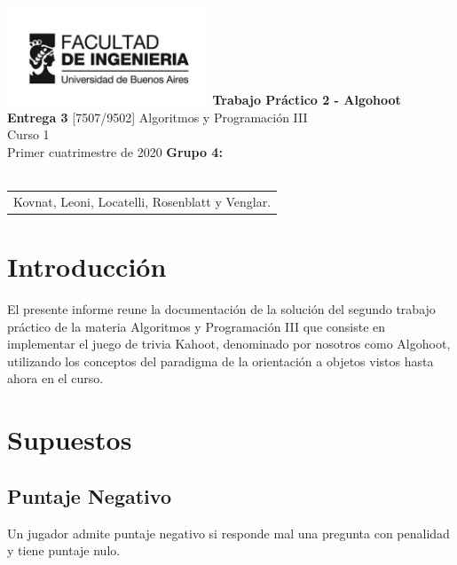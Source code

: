 \documentclass[titlepage,a4paper]{article}
\begin{document}
\begin{titlepage} %
	\hfill\includegraphics[width=6cm]{img/logofiuba.jpg}
    \centering
    \vfill
    \Huge \textbf{Trabajo Práctico 2 - Algohoot\\ Entrega 3}
    \vskip2cm
    \Large [7507/9502] Algoritmos y Programación III\\
    Curso 1\\ %
    Primer cuatrimestre de 2020 
    \vfill
    \textbf{Grupo 4:}\\$ $\\
    \begin{tabular}{  l  } %
      Kovnat, Leoni, Locatelli, Rosenblatt y Venglar. %
  	\end{tabular}
    \vfill
    \vfill
\end{titlepage}

\tableofcontents %
\newpage

\section{Introducción}\label{sec:intro}
El presente informe reune la documentación de la solución del segundo trabajo práctico de la materia Algoritmos y Programación III que consiste en implementar el juego de trivia Kahoot, denominado por nosotros como Algohoot, utilizando los conceptos del paradigma de la orientación a objetos vistos hasta ahora en el curso.

\section{Supuestos}\label{sec:supuestos}

\subsection{Puntaje Negativo}

Un jugador admite puntaje negativo si responde mal una pregunta con penalidad y tiene puntaje nulo. 
\end{document}
